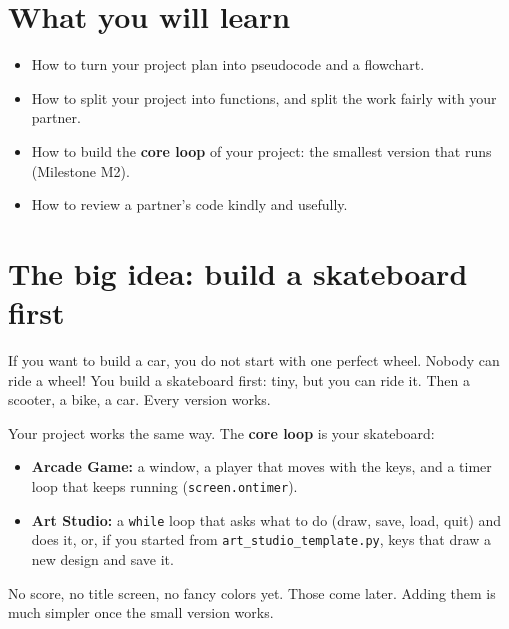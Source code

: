 
\section{What you will learn}
\begin{itemize}
  \item How to turn your project plan into pseudocode and a flowchart.
  \item How to split your project into functions, and split the work fairly with your partner.
  \item How to build the \textbf{core loop} of your project: the smallest version that runs (Milestone M2).
  \item How to review a partner's code kindly and usefully.
\end{itemize}

\section{The big idea: build a skateboard first}
If you want to build a car, you do not start with one perfect wheel. Nobody can ride a wheel! You
build a skateboard first: tiny, but you can ride it. Then a scooter, a bike, a car. Every version works.

Your project works the same way. The \textbf{core loop} is your skateboard:
\begin{itemize}
  \item \textbf{Arcade Game:} a window, a player that moves with the keys, and a timer loop that keeps running (\texttt{screen.ontimer}).
  \item \textbf{Art Studio:} a \texttt{while} loop that asks what to do (draw, save, load, quit) and does it,
        or, if you started from \texttt{art\_studio\_template.py}, keys that draw a new design and save it.
\end{itemize}
No score, no title screen, no fancy colors yet. Those come later. Adding them is much simpler once
the small version works.

